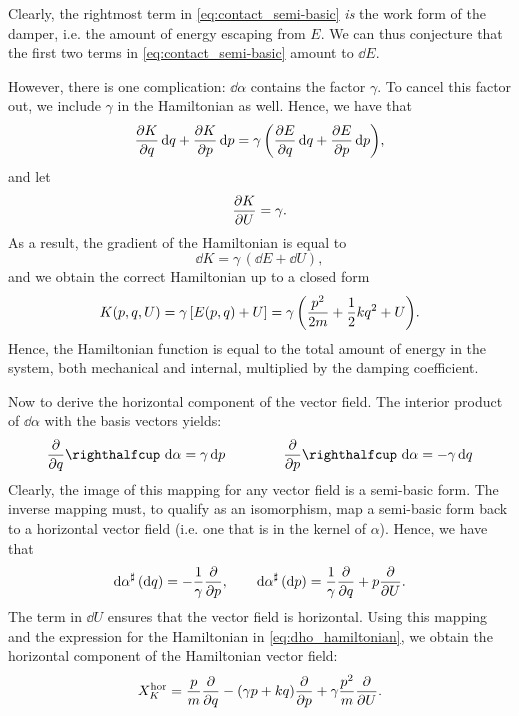 Clearly, the rightmost term in \cref{eq:contact_semi-basic} \emph{is} the work form of the damper, i.e. the amount of energy escaping from \(E\). We can thus conjecture that the first two terms in \cref{eq:contact_semi-basic} amount to \(\dd{E}\).

However, there is one complication: \(\dd{\alpha}\) contains the factor \(\gamma\). To cancel this factor out, we include \(\gamma\) in the Hamiltonian as well. Hence, we have that 
\begin{equation}
     \pdv{K}{q}\dd{q} + \pdv{K}{p}\dd{p} = \gamma \,\qty(\pdv{E}{q}\dd{q} + \pdv{E}{p}\dd{p}),
\end{equation}
and let 
\begin{equation}
     \pdv{K}{U} = \gamma.
\end{equation}
As a result, the gradient of the Hamiltonian is equal to 
\begin{equation}
     \dd{K} = \gamma\,(\dd{E} + \dd{U}),
\end{equation}
and we obtain the correct Hamiltonian up to a closed form
\begin{equation} 
    K(p, q, U) = \gamma\,\qty[E(p, q) + U] = \gamma\,\qty( \frac{p^2}{2m} + \frac{1}{2}kq^2 + U). 
    \label{eq:dho_hamiltonian}
\end{equation} 
Hence, the Hamiltonian function is equal to the total amount of energy in the system, both mechanical and internal, multiplied by the damping coefficient.

Now to derive the horizontal component of the vector field. The interior product of \(\dd{\alpha}\) with the basis vectors yields:
\begin{equation}
    \intpr{\pdv{}{q}}{\dd{\alpha}} = \gamma \dd{p} \qquad \qquad \intpr{\pdv{}{p}}{\dd{\alpha}} = -\gamma \dd{q}
\end{equation}
Clearly, the image of this mapping for any vector field is a semi-basic form. The inverse mapping must, to qualify as an isomorphism, map a semi-basic form back to a horizontal vector field (i.e. one that is in the kernel of \(\alpha\)). Hence, we have that
\begin{equation} 
    \dd{\alpha}^\sharp\qty(\dd{q}) = -\frac{1}{\gamma} \pdv{}{p}, \qquad 
    \dd{\alpha}^\sharp\qty(\dd{p}) = \frac{1}{\gamma}\pdv{}{q} +  p \pdv{}{U}. 
\end{equation}
The term in \(\dd{U}\) ensures that the vector field is horizontal. Using this mapping and the expression for the Hamiltonian in \cref{eq:dho_hamiltonian}, we obtain the horizontal component of the Hamiltonian vector field:
\begin{equation} 
    X_K^\text{hor} = \frac{p}{m}\pdv{}{q} - (\gamma p + kq)\pdv{}{p} + \gamma \frac{p^2}{m} \pdv{}{U}.
    \label{eq:dho_horizontal}
\end{equation}

